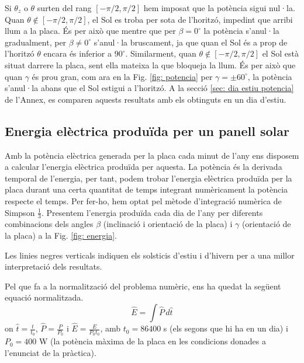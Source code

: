 \documentclass[11pt]{article}
\begin{document}
Si $\theta_z$ o $\theta$ surten del rang $[-\pi/2,\pi/2]$ hem imposat que la potència sigui nul·la. Quan $\theta \notin [-\pi/2,\pi/2]$, el Sol es troba per sota de l'horitzó, impedint que arribi llum a la placa. És per això que mentre que per $\beta = 0^{\circ}$ la potència s'anul·la gradualment, per $\beta \neq 0^{\circ}$ s'anul·la bruscament, ja que quan el Sol és a prop de l’horitzó $\theta$ encara és inferior a $90^{\circ}$. Similarment, quan $\theta \notin [-\pi/2,\pi/2]$ el Sol està situat darrere la placa, sent ella mateixa la que bloqueja la llum. És per això que quan $\gamma$ és prou gran, com ara en la Fig. \ref{fig: potencia} per $\gamma=\pm60^{\circ}$, la potència s'anul·la abans que el Sol estigui a l'horitzó. A la secció \ref{sec: dia estiu potencia} de l'Annex, es comparen aquests resultats amb els obtinguts en un dia d'estiu.

\subsection{Energia elèctrica produïda per un panell solar}
Amb la potència elèctrica generada per la placa cada minut de l'any ens disposem a calcular l'energia elèctrica produïda per aquesta. La potència és la derivada temporal de l'energia, per tant, podem trobar l'energia elèctrica produïda per la placa durant una certa quantitat de temps integrant numèricament la potència respecte el temps. Per fer-ho, hem optat pel mètode d'integració numèrica de Simpson $\frac{1}{3}$. Presentem l'energia produïda cada dia de l'any per diferents combinacions dels angles $\beta$ (inclinació i orientació de la placa) i $\gamma$ (orientació de la placa) a la Fig. \ref{fig: energia}.



Les linies negres verticals indiquen els solsticis d'estiu i d'hivern per a una millor interpretació dels resultats.

Pel que fa a la normalització del problema numèric, ens ha quedat la següent equació normalitzada.
\begin{equation}
    \hat{E} = \int \hat{P} \, d\hat{t}
    \label{energia}
\end{equation}
on $\hat{t}=\frac{t}{t_0}$, $\hat{P}=\frac{P}{P_0}$ i $\hat{E}=\frac{E}{P_0 t_0}$, amb $t_0=86400$ s (els segons que hi ha en un dia) i $P_0=400$ W (la potència màxima de la placa en les condicions donades a l'enunciat de la pràctica). 
\end{document}

